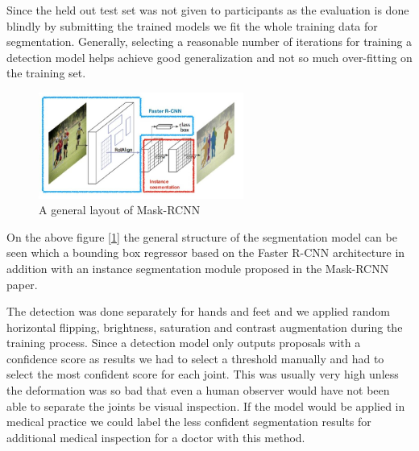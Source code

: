 \documentclass[a4paper,12pt]{article}
\begin{document}
\vspace{4mm}

\par Since the held out test set was not given to participants as the evaluation is done blindly by submitting the trained models we fit the whole training data for segmentation. Generally, selecting a reasonable number of iterations for training a detection model helps achieve good generalization and not so much over-fitting on the training set.

\vspace{4mm}

\begin{figure}[H]
    \centering
    \includegraphics[width=0.6\textwidth]{ra/maskrcnn.jpg}
    \caption{A general layout of Mask-RCNN}
    \label{fig:mask-rcnn}
\end{figure}

\vspace{4mm}

\par On the above figure [\ref{fig:mask-rcnn}] the general structure of the segmentation model can be seen which a bounding box regressor based on the Faster R-CNN \cite{ren2015faster} architecture in addition with an instance segmentation module proposed in the Mask-RCNN paper.

\vspace{4mm}

\par The detection was done separately for hands and feet and we applied random horizontal flipping, brightness, saturation and contrast augmentation during the training process. Since a detection model only outputs proposals with a confidence score as results we had to select a threshold manually and had to select the most confident score for each joint. This was usually very high unless the deformation was so bad that even a human observer would have not been able to separate the joints be visual inspection. If the model would be applied in medical practice we could label the less confident segmentation results for additional medical inspection for a doctor with this method.
\end{document}
